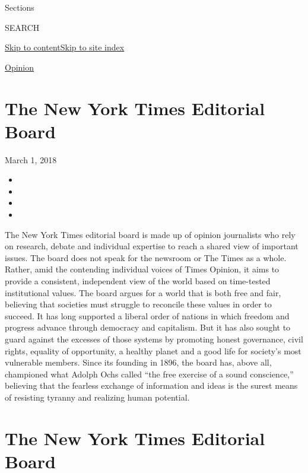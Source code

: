 Sections

SEARCH

\protect\hyperlink{site-content}{Skip to
content}\protect\hyperlink{site-index}{Skip to site index}

\href{/section/opinion}{Opinion}

\hypertarget{the-new-york-times-editorial-board}{%
\section{The New York Times Editorial
Board}\label{the-new-york-times-editorial-board}}

March 1, 2018

\begin{itemize}
\item
\item
\item
\item
\end{itemize}

The New York Times editorial board is made up of opinion journalists who
rely on research, debate and individual expertise to reach a shared view
of important issues. The board does not speak for the newsroom or The
Times as a whole. Rather, amid the contending individual voices of Times
Opinion, it aims to provide a consistent, independent view of the world
based on time-tested institutional values. The board argues for a world
that is both free and fair, believing that societies must struggle to
reconcile these values in order to succeed. It has long supported a
liberal order of nations in which freedom and progress advance through
democracy and capitalism. But it has also sought to guard against the
excesses of those systems by promoting honest governance, civil rights,
equality of opportunity, a healthy planet and a good life for society's
most vulnerable members. Since its founding in 1896, the board has,
above all, championed what Adolph Ochs called ``the free exercise of a
sound conscience,'' believing that the fearless exchange of information
and ideas is the surest means of resisting tyranny and realizing human
potential.

\hypertarget{the-new-york-times-editorial-board-1}{%
\section{The New York Times Editorial
Board}\label{the-new-york-times-editorial-board-1}}

